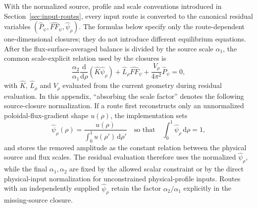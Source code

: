 \documentclass[final, 3p, times]{elsarticle}
\begin{document}
With the normalized source, profile and scale conventions introduced in Section~\ref{sec:input-routes}, every input route is converted to the canonical residual variables $(\hat{P}_\psi,\hat{FF}_\psi,\hat{\psi}_\rho)$. The formulas below specify only the route-dependent one-dimensional closures; they do not introduce different equilibrium equations. After the flux-surface-averaged balance is divided by the source scale $\alpha_1$, the common scale-explicit relation used by the closures is
\begin{equation}
    \frac{\alpha_2}{\alpha_1}
    \frac{\mathrm{d}}{\mathrm{d}\rho}
    \left(\hat{K}\hat{\psi}_\rho\right)
    +\hat{L}_\rho\hat{FF}_\psi
    +\frac{V_\rho}{4\pi^2}\hat{P}_\psi=0,
    \label{eq:pf-average-closure}
\end{equation}
with $\hat{K}$, $\hat{L}_\rho$ and $V_\rho$ evaluated from the current geometry during residual evaluation. In this appendix, ``absorbing the scale factor'' denotes the following source-closure normalization. If a route first reconstructs only an unnormalized poloidal-flux-gradient shape $u(\rho)$, the implementation sets
\begin{equation}
    \hat{\psi}_\rho(\rho)
    =\frac{u(\rho)}{\displaystyle\int_0^1u(\rho')\,\mathrm{d}\rho'}
    \quad\text{so that}\quad
    \int_0^1\hat{\psi}_\rho\,\mathrm{d}\rho=1 ,
\end{equation}
and stores the removed amplitude as the constant relation between the physical source and flux scales. The residual evaluation therefore uses the normalized $\hat{\psi}_\rho$, while the final $\alpha_1,\alpha_2$ are fixed by the allowed scalar constraint or by the direct physical-input normalization for unconstrained physical-profile inputs. Routes with an independently supplied $\hat{\psi}_\rho$ retain the factor $\alpha_2/\alpha_1$ explicitly in the missing-source closure.
\end{document}
